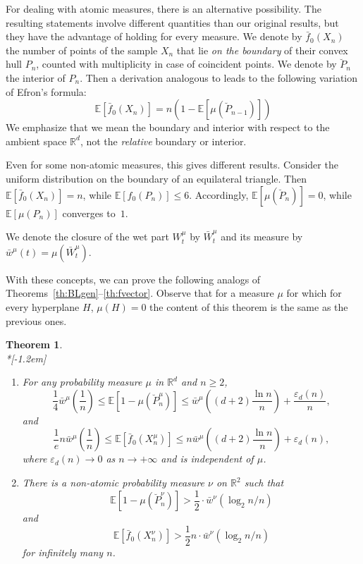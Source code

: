 \documentclass[10pt]{amsart}
\newtheorem{theo}{Theorem}[section]
\theoremstyle{definition}\newtheorem{defi}[theo]{Definition}\newtheorem{rema}[theo]{Remark}\newtheorem{exam}[theo]{Example}\newtheorem{exem}[theo]{Example}\newtheorem{nota}[theo]{Notation}
\newcommand{\Rbb}{\mathbb{R}}%
\newcommand{\Ebb}{\mathbb{E}}%
\newcommand{\ptb}[1]{\left[#1 \right]}
\newcommand*{\mtfrac}[2]{\frac{#1}{#2}}%
\newcommand*{\romanenumi}{\renewcommand*{\theenumi}{\roman{enumi}}}
\begin{document}
For dealing with atomic measures, there is an alternative possibility. The resulting statements involve different quantities than our original results, but they have the advantage of holding for every measure. We denote by $\bar f_0(X_n)$ the number of points of the sample $X_n$ that lie \emph{on the boundary} of their convex hull $P_n $, counted with multiplicity in case of coincident points. We denote by $\breve P_n $ the interior of $P_n $. Then a derivation analogous to \thetag{\ref{eq:Efron0}--\ref{eq:Efron}} leads to the following variation of
Efron's formula: %
\begin{equation}\label{eq:Ef-open}
\Ebb [\bar f_0(X_n)] =n(1-\Ebb [\mu(\breve P_{n-1})])
\end{equation}
We emphasize that we mean the boundary and interior with respect to the ambient space $\Rbb^d$, not the \emph{relative} boundary or interior.

Even for some non-atomic measures, this gives different results. Consider the uniform distribution on the boundary of an equilateral triangle. Then $\Ebb[\bar f_0(X_n)]=n$, while $\Ebb[f_0(P_n)]\le 6$. Accordingly, $\Ebb [\mu(\breve P_{n})]=0$, while $\Ebb [\mu(P_{n})]$ converges to~$1$.

We denote the closure of the wet part $W_t^{\mu}$ by $\bar W_t^{\mu}$ and its measure by $\bar w^{\mu}(t)=\mu(\bar W_t^{\mu})$.

With these concepts, we can prove the following analogs of Theorems~\ref{th:BLgen}--\ref{th:fvector}. Observe that for a measure $\mu$ for which for every hyperplane $H$, $\mu(H)=0$ the content of this theorem is the same as the previous ones.

\begin{theo}\ \\*[-1.2em]
\begin{enumerate}\romanenumi
\item \label{list.5.1.1} For any probability measure $\mu$ in $\Rbb^d$ and $n \ge 2$,
\begin{equation}\label{eq:closed-wet}
\mtfrac 14 \bar w^{\mu}\left(\mtfrac1n\right) \le {\Ebb[1-\mu(\breve P_n^\mu)]} \le
\bar w^{\mu}\left((d+2)\mtfrac{\ln n}n\right) + \mtfrac{\varepsilon_d(n)}{n},
\end{equation}
and
\begin{equation}\label{eq:boundary-f0}
\mtfrac 1e n \bar w^{\mu}\left(\mtfrac1n\right) \le \Ebb\ptb{\bar f_0(X_n^\mu)} \le n \bar w^{\mu}\left({(d+2)\mtfrac{\ln n}n}\right) + \varepsilon_d(n),
\end{equation}
where $\varepsilon_d(n)\to 0$ as $n\to+\infty$ and is independent of $\mu$.
\item \label{list.5.1.2} There is a non-atomic probability measure $\nu$ on $\Rbb^2$ such that
\[
\Ebb[1-\mu(\breve P_n^\nu)] > \mtfrac 1{2} \cdot
\bar w^\nu(\log_2 n/ n)
\]
and
\[
\Ebb\ptb{\bar f_0(X_n^\nu)} > \mtfrac 1{2} n \cdot
\bar w^\nu({\log_2 n/ n})
\]
for infinitely many $n$.
\end{enumerate}
\end{theo}
\end{document}
